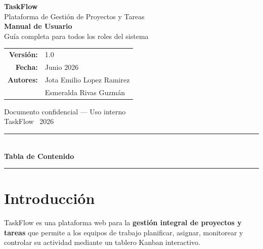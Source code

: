 \documentclass[12pt, a4paper]{article}
\begin{document}
\begin{titlepage}
  \pagecolor{primary}
  \color{white}
  \vspace*{2cm}
  \begin{center}
    {\fontsize{52}{60}\selectfont\bfseries TaskFlow}\\[0.5em]
    {\Large\color{white!80!primary} Plataforma de Gestión de Proyectos y Tareas}\\[3cm]

    {\Huge\bfseries Manual de Usuario}\\[0.8em]
    {\large\color{white!70!primary} Guía completa para todos los roles del sistema}\\[3cm]

    \begin{tabular}{rl}
      \textbf{Versión:}   & 1.0 \\[4pt]
      \textbf{Fecha:}     & Junio 2026 \\[4pt]
      \textbf{Autores:}   & Jota Emilio Lopez Ramirez \\
                           & Esmeralda Rivas Guzmán \\[4pt]
    \end{tabular}

    \vfill
    {\small\color{white!60!primary}
      Documento confidencial — Uso interno\\
      TaskFlow \textcopyright\ 2026
    }
  \end{center}
\end{titlepage}
\nopagecolor

\newpage
\thispagestyle{empty}
{\color{primary}\rule{\textwidth}{2pt}}\\[0.4em]
{\Large\bfseries\color{primary} Tabla de Contenido}\\[0.2em]
{\color{bordergray}\rule{\textwidth}{0.5pt}}
\vspace{0.5em}
\tableofcontents
\newpage

\section{Introducción}

TaskFlow es una plataforma web para la \textbf{gestión integral de proyectos y tareas} que permite a los equipos de trabajo planificar, asignar, monitorear y controlar su actividad mediante un tablero Kanban interactivo.
\end{document}
